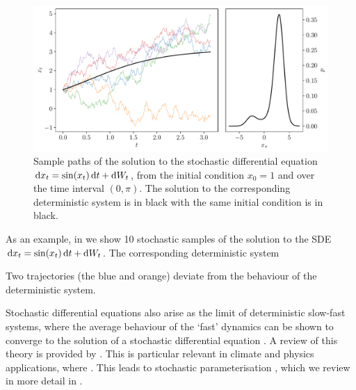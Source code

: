 \begin{figure}
	\begin{center}
		\includegraphics[width=\textwidth]{figures/ou_solution.pdf}
		\caption{Sample paths of the solution to the stochastic differential equation \(\dif x_t = \sin\!\left(x_t\right)\dif t + \dif W_t\), from the initial condition \(x_0 = 1\) and over the time interval \((0,\pi)\).
			The solution to the corresponding deterministic system is in black with the same initial condition is in black.}
		\label{fig:sde_sol_sample}
	\end{center}
\end{figure}

As an example, in  we show 10 stochastic samples of the solution to the SDE \(\dif x_t = \sin\!\left(x_t\right)\dif t + \dif W_t\).
The corresponding deterministic system

Two trajectories (the blue and orange) deviate from the behaviour of the deterministic system.



Stochastic differential equations also arise as the limit of deterministic slow-fast systems, where the average behaviour of the `fast' dynamics can be shown to converge to the solution of a stochastic differential equation \citep[e.g.]{WongZakai_1965_ConvergenceOrdinaryIntegrals,MelbourneStuart_2011_NoteDiffusionLimits,GottwaldMelbourne_2013_HomogenizationDeterministicMaps}.
A review of this theory is provided by \citet{GivonEtAl_2004_ExtractingMacroscopicDynamics}.
This is particular relevant in climate and physics applications, where \citep{FranzkeEtAl_2015_StochasticClimateTheory}.
This leads to stochastic parameterisation \citep{BernerEtAl_2017_StochasticParameterizationNew,Palmer_2019_StochasticWeatherClimate}, which we review in more detail in .




